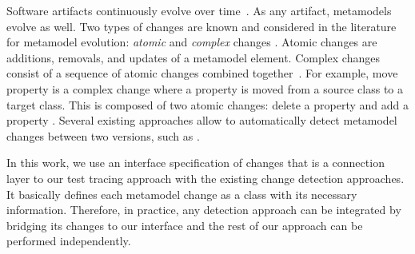 Software artifacts continuously evolve over time~\cite{mens2008introduction}.
As any artifact, metamodels evolve as well.  
Two types of changes are known and considered in the literature for metamodel evolution: \emph{atomic} and \emph{complex} changes \cite{Herrmannsdoerfer2011}. 
Atomic changes are additions, removals, and updates of a metamodel element. Complex changes consist of a sequence of atomic changes combined together~\cite{vermolen_reconstructing_2012,khelladi2015detecting}. For example, move property is a complex change where a property is moved from a source class to a target class. This is composed of two atomic changes: delete a property and add a property \cite{Herrmannsdoerfer2011}. 
Several existing approaches allow to automatically detect metamodel changes between two versions, such as \cite{Alter2015, williams2012searching,cicchetti_managing_2009,langer_posteriori_2013,vermolen_reconstructing_2012,Khelladi2016}.

In this work, we use an interface specification of changes {\small{}} that is a connection layer to our test tracing approach with the existing change detection approaches. It basically defines each metamodel change as a class with its necessary information. Therefore, in practice, any detection approach \cite{Alter2015, williams2012searching,cicchetti_managing_2009,langer_posteriori_2013,vermolen_reconstructing_2012,Khelladi2016} can be integrated by bridging its changes to our interface and the rest of our approach can be performed independently. 

